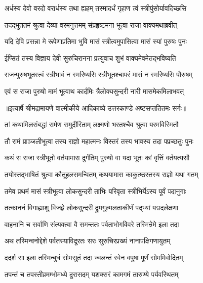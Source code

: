 \twolineshloka
{अर्धस्य देवो वरदो वरार्धस्य तथा ह्यहम्}
{तस्मादर्धं गृहाण त्वं स्त्रीपुंसोर्यावदिच्छसि} %

\twolineshloka
{तदद्भुततमं श्रुत्वा देव्या वरमनुत्तमम्}
{संप्रहृष्टमना भूत्वा राजा वाक्यमथाब्रवीत्} %

\twolineshloka
{यदि देवि प्रसन्ना मे रूपेणाप्रतिमा भुवि}
{मासं स्त्रीत्वमुपासित्वा मासं स्यां पुरुषः पुनः} %

\twolineshloka
{ईप्सितं तस्य विज्ञाय देवी सुरुचिरानना}
{प्रत्युवाच शुभं वाक्यमेवमेतद्भविष्यति} %

\twolineshloka
{राजन्पुरुषभूतस्त्वं स्त्रीभावं न स्मरिष्यसि}
{स्त्रीभूतश्चापरं मासं न स्मरिष्यसि पौरुषम्} %

\twolineshloka
{एवं स राजा पुरुषो मामं भूत्वाथ कार्दमिः}
{त्रैलोक्यसुन्दरी नारी मासमेकमिलाभवत्} %


{॥इत्यार्षे श्रीमद्रामायणे वाल्मीकीये आदिकाव्ये उत्तरकाण्डे अष्टसप्ततितमः सर्गः॥}


\twolineshloka
{तां कथामिलसंबद्धां रामेण समुदीरिताम्}
{लक्ष्मणो भरतश्चैव श्रुत्वा परमविस्मितौ} %

\twolineshloka
{तौ रामं प्राञ्जलीभूत्वा तस्य राज्ञो महात्मनः}
{विस्तरं तस्य भावस्य तदा पप्रच्छतुः पुनः} %

\twolineshloka
{कथं स राजा स्त्रीभूतो वर्तयामास दुर्गतिम्}
{पुरुषो वा यदा भूतः कां वृत्तिं वर्तयत्यसौ} %

\twolineshloka
{तयोस्तद्भाषितं श्रुत्वा कौतूहलसमन्वितम्}
{कथयामास काकुत्ष्ठस्तस्य राज्ञो यथा गतम्} %

\twolineshloka
{तमेव प्रथमं मासं स्त्रीभूत्वा लोकसुन्दरी}
{ताभिः परिवृता स्त्रीभिर्येऽस्य पूर्वं पदानुगाः} %

\twolineshloka
{तत्काननं विगाह्याशु विजह्रे लोकसुन्दरी}
{द्रुमगुल्मलताकीर्णं पद्भ्यां पद्मदलेक्षणा} %

\twolineshloka
{वाहनानि च सर्वाणि संत्यक्त्वा वै समन्ततः}
{पर्वताभोगविवरे तस्मिन्रेमे इला तदा} %

\twolineshloka
{अथ तस्मिन्वनोद्देशे पर्वतस्याविदूरतः}
{सरः सुरुचिरप्रख्यं नानापक्षिगणायुतम्} %

\twolineshloka
{ददर्श सा इला तस्मिन्बुधं सोमसुतं तदा}
{ज्वलन्तं स्वेन वपुषा पूर्णं सोममिवोदितम्} %

\twolineshloka
{तपन्तं च तपस्तीव्रमम्भोमध्ये दुरासदम्}
{यशक्सरं कामगमं तारुण्ये पर्यवस्थितम्} %

